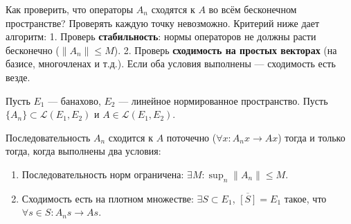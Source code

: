 \begin{idea}
	Как проверить, что операторы $A_n$ сходятся к $A$ во всём бесконечном пространстве? Проверять каждую точку невозможно.
	Критерий ниже дает алгоритм:
	1. Проверь \textbf{стабильность}: нормы операторов не должны расти бесконечно ($\|A_n\| \le M$).
	2. Проверь \textbf{сходимость на простых векторах} (на базисе, многочленах и т.д.).
	Если оба условия выполнены — сходимость есть везде.
\end{idea}


\begin{theorem}\label{bshetengcorollary}
	Пусть $E_1$ --- банахово, $E_2$ --- линейное нормированное пространство.
	Пусть $\{A_n\} \subset \mathcal{L}(E_1, E_2)$ и $A \in \mathcal{L}(E_1, E_2)$.
	
	Последовательность $A_n$ сходится к $A$ поточечно ($\forall x: A_n x \to Ax$) тогда и только тогда, когда выполнены два условия:
	\begin{enumerate}
		\item Последовательность норм ограничена: $\exists M: \sup_n \|A_n\| \leqslant M$.
		\item Сходимость есть на плотном множестве: $\exists S \subset E_1$, $\overline{[S]} = E_1$ такое, что $\forall s \in S: A_n s \to As$.
	\end{enumerate}
\end{theorem}

